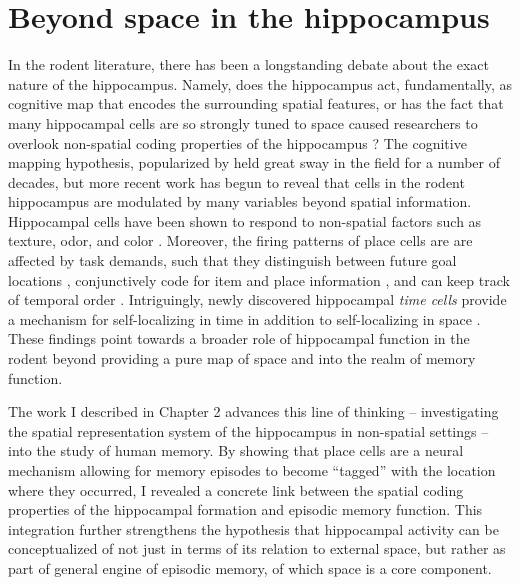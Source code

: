 


\section{Beyond space in the hippocampus}
In the rodent literature, there has been a longstanding debate about the exact nature of the hippocampus. Namely, does the hippocampus act, fundamentally, as cognitive map that encodes the surrounding spatial features, or has the fact that many hippocampal cells are so strongly tuned to space caused researchers to overlook non-spatial coding properties of the hippocampus \citep{EichEtal99}? The cognitive mapping hypothesis, popularized by \citet{OKeeNade78} held great sway in the field for a number of decades, but more recent work has begun to reveal that cells in the rodent hippocampus are modulated by many variables beyond spatial information. Hippocampal cells have been shown to respond to non-spatial factors such as texture, odor, and color \citep{YounEtal94,WoodEtal99,LeutEtal05,IgarEtal14}. Moreover, the firing patterns of place cells are are affected by task demands, such that they distinguish between future goal locations \citep{WoodEtal00,FerbShap03}, conjunctively code for item and place information \citep{KomoEtal09}, and can keep track of temporal order \citep{MannEtal07}. Intriguingly, newly discovered hippocampal \textit{time cells} provide a mechanism for self-localizing in time in addition to self-localizing in space \citep{MacDEtal11,KrauEtal13}. These findings point towards a broader role of hippocampal function in the rodent beyond providing a pure map of space and into the realm of memory function.

The work I described in Chapter 2 advances this line of thinking -- investigating the spatial representation system of the hippocampus in non-spatial settings -- into the study of human memory. By showing that place cells are a neural mechanism allowing for memory episodes to become ``tagged'' with the location where they occurred, I revealed a concrete link between the spatial coding properties of the hippocampal formation and episodic memory function. This integration further strengthens the hypothesis that hippocampal activity can be conceptualized of not just in terms of its relation to external space, but rather as part of general engine of episodic memory, of which space is a core component.

